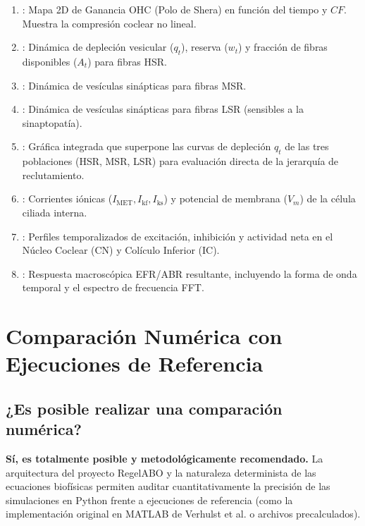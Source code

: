 \documentclass[12pt,a4paper]{article}
\begin{document}
\begin{enumerate}
    \item {}: Mapa 2D de Ganancia OHC (Polo de Shera) en función del tiempo y $CF$. Muestra la compresión coclear no lineal.
    \item {}: Dinámica de depleción vesicular ($q_t$), reserva ($w_t$) y fracción de fibras disponibles ($A_t$) para fibras HSR.
    \item {}: Dinámica de vesículas sinápticas para fibras MSR.
    \item {}: Dinámica de vesículas sinápticas para fibras LSR (sensibles a la sinaptopatía).
    \item {}: Gráfica integrada que superpone las curvas de depleción $q_t$ de las tres poblaciones (HSR, MSR, LSR) para evaluación directa de la jerarquía de reclutamiento.
    \item {}: Corrientes iónicas ($I_{\text{MET}}, I_{\text{kf}}, I_{\text{ks}}$) y potencial de membrana ($V_m$) de la célula ciliada interna.
    \item {}: Perfiles temporalizados de excitación, inhibición y actividad neta en el Núcleo Coclear (CN) y Colículo Inferior (IC).
    \item {}: Respuesta macroscópica EFR/ABR resultante, incluyendo la forma de onda temporal y el espectro de frecuencia FFT.
\end{enumerate}

\section{Comparación Numérica con Ejecuciones de Referencia}

\subsection{¿Es posible realizar una comparación numérica?}
\textbf{Sí, es totalmente posible y metodológicamente recomendado.} La arquitectura del proyecto RegelABO y la naturaleza determinista de las ecuaciones biofísicas permiten auditar cuantitativamente la precisión de las simulaciones en Python frente a ejecuciones de referencia (como la implementación original en MATLAB de Verhulst et al. o archivos precalculados).
\end{document}
